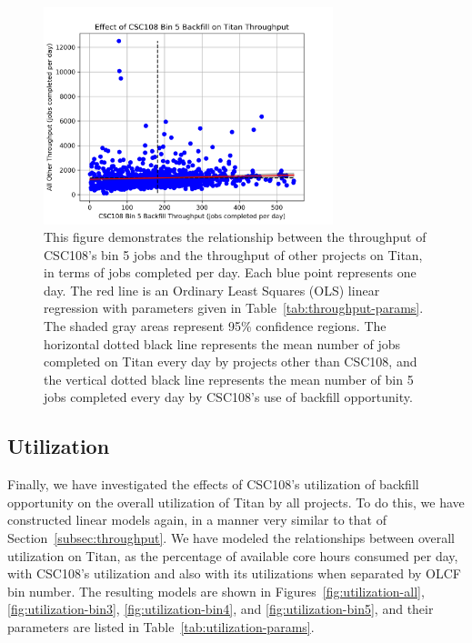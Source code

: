 \begin{figure}
  \includegraphics[width=0.75\textwidth]{images/linfit-throughput-bin5.png}
\caption{This figure demonstrates the relationship between the throughput of
CSC108's bin 5 jobs and the throughput of other projects on Titan, in terms of
jobs completed per day. Each blue point represents one day. The red line is an
Ordinary Least Squares (OLS) linear regression with parameters given in
Table~\ref{tab:throughput-params}. The shaded gray areas represent 95\%
confidence regions. The horizontal dotted black line represents the mean number
of jobs completed on Titan every day by projects other than CSC108, and the
vertical dotted black line represents the mean number of bin 5 jobs completed
every day by CSC108's use of backfill opportunity.}
\label{fig:throughput-bin5}
\end{figure}


\subsection{Utilization}
\label{subsec:utilization}

Finally, we have investigated the effects of CSC108's utilization of backfill
opportunity on the overall utilization of Titan by all projects. To do this, we
have constructed linear models again, in a manner very similar to that of
Section~\ref{subsec:throughput}. We have modeled the relationships between
overall utilization on Titan, as the percentage of available core hours
consumed per day, with CSC108's utilization and also with its utilizations when
separated by OLCF bin number. The resulting models are shown in
Figures~\ref{fig:utilization-all}, \ref{fig:utilization-bin3},
\ref{fig:utilization-bin4}, and \ref{fig:utilization-bin5}, and their
parameters are listed in Table~\ref{tab:utilization-params}.

